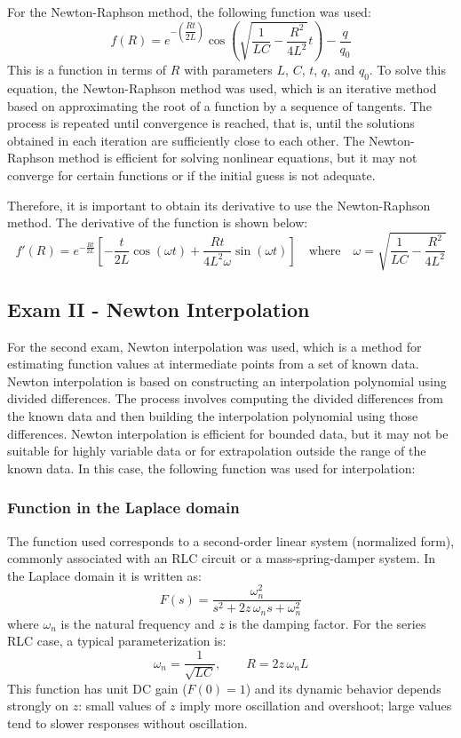 \documentclass[pdflatex,sn-mathphys-num]{sn-jnl}%
\begin{document}
For the Newton-Raphson method, the following function was used:
\begin{equation}
f(R)= e^{-\left(\dfrac{Rt}{2L} \right)} \cos(\sqrt{\dfrac{1}{LC}-\dfrac{R^2}{4L^2}}t)-\dfrac{q}{q_0}   
\end{equation}
This is a function in terms of $R$ with parameters $L$, $C$, $t$, $q$, and $q_0$. To solve this equation, the Newton-Raphson method was used, which is an iterative method based on approximating the root of a function by a sequence of tangents. The process is repeated until convergence is reached, that is, until the solutions obtained in each iteration are sufficiently close to each other. The Newton-Raphson method is efficient for solving nonlinear equations, but it may not converge for certain functions or if the initial guess is not adequate.

Therefore, it is important to obtain its derivative to use the Newton-Raphson method. The derivative of the function is shown below:
\begin{equation}
f'(R)=e^{-\frac{Rt}{2L}}
\left[
-\frac{t}{2L}\cos(\omega t)
+
\frac{Rt}{4L^{2}\omega}\sin(\omega t)
\right] \quad \text{where} \quad \omega = \sqrt{\dfrac{1}{LC}-\dfrac{R^2}{4L^2}}
\end{equation}

\subsection{Exam II - Newton Interpolation}
For the second exam, Newton interpolation was used, which is a method for estimating function values at intermediate points from a set of known data. Newton interpolation is based on constructing an interpolation polynomial using divided differences. The process involves computing the divided differences from the known data and then building the interpolation polynomial using those differences. Newton interpolation is efficient for bounded data, but it may not be suitable for highly variable data or for extrapolation outside the range of the known data. In this case, the following function was used for interpolation:

\subsubsection{Function in the Laplace domain}
The function used corresponds to a second-order linear system (normalized form), commonly associated with an RLC circuit or a mass-spring-damper system. In the Laplace domain it is written as:
\begin{equation}
F(s)=\frac{\omega_n^{2}}{s^{2}+2z\,\omega_n s+\omega_n^{2}}
\end{equation}
where $\omega_n$ is the natural frequency and $z$ is the damping factor. For the series RLC case, a typical parameterization is:
\begin{equation}
\omega_n=\frac{1}{\sqrt{LC}},\qquad R=2z\,\omega_n L
\end{equation}
This function has unit DC gain ($F(0)=1$) and its dynamic behavior depends strongly on $z$: small values of $z$ imply more oscillation and overshoot; large values tend to slower responses without oscillation.
\end{document}
